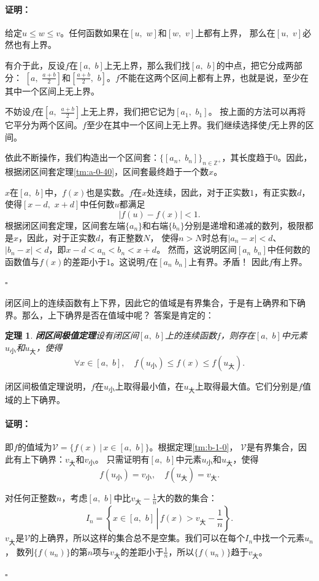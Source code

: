 \documentclass[12pt,UTF8]{ctexbook}
\newtheorem{tm}{定理}[section]
\renewenvironment{proof}{\paragraph{\textbf{证明：}}}{\hfill$\square$}
\begin{document}
\begin{appendix}
\begin{proof}
    给定$u \leqslant w \leqslant v$。任何函数如果在$[u,\,\, w]$和$[w,\,\, v]$上都有上界，
    那么在$[u,\,\, v]$必然也有上界。

    有介于此，反设$f$在$[a,\,\, b]$上无上界，那么我们找$[a,\,\, b]$的中点，把它分成两部分：
    $[a,\,\,\frac{a+b}{2}]$和$[\frac{a+b}{2},\,\, b]$。$f$不能在这两个区间上都有上界，也就是说，至少在其中一个区间上无上界。

    不妨设$f$在$[a,\,\,\frac{a+b}{2}]$上无上界，我们把它记为$[a_1,\,\, b_1]$。
    按上面的方法可以再将它平分为两个区间。$f$至少在其中一个区间上无上界。我们继续选择使$f$无上界的区间。

    依此不断操作，我们构造出一个区间套：$\{[a_n,\,\,b_n]\}_{n\in\mathbb{Z}^+}$，其长度趋于$0$。因此，根据闭区间套定理\ref{tm:a-0-40}，区间套最终趋于一个数$x$。

    $x$在$[a,\,\, b]$中，$f(x)$也是实数。$f$在$x$处连续，因此，对于正实数$1$，有正实数$d$，使得$[x-d,\,\,x+d]$中任何数$u$都满足
    $$ |f(u) - f(x)| < 1.$$
    根据闭区间套定理，区间套左端$\{a_n\}$和右端$\{b_n\}$分别是递增和递减的数列，极限都是$x$，因此，对于正实数$d$，有正整数$N$，
    使得$n>N$时总有$|a_n - x| < d$、$|b_n - x| < d$，即$x - d < a_n < b_n < x+d$。
    然而，这说明区间$[a_n\,\,b_n]$中任何数的函数值与$f(x)$的差距小于$1$。这说明$f$在$[a_n\,\,b_n]$上有界。矛盾！
    因此$f$有上界。

\end{proof}

闭区间上的连续函数有上下界，因此它的值域是有界集合，于是有上确界和下确界。那么，上下确界是否在值域中呢？
答案是肯定的：
\begin{tm}{\textbf{闭区间极值定理}}\label{tm:b-1-5}
    设有闭区间$[a,\,\, b]$上的连续函数$f$，则存在$[a,\,\,b]$中元素$u_{\text{小}}$和$u_{\text{大}}$，使得
    $$ \forall x\in[a,\,\,b], \quad f(u_{\text{小}}) \leqslant f(x) \leqslant f(u_{\text{大}}).$$
\end{tm}
闭区间极值定理说明，$f$在$u_{\text{小}}$上取得最小值，在$u_{\text{大}}$上取得最大值。它们分别是$f$值域的上下确界。
\begin{proof}
    即$f$的值域为$\mathcal{V} = \{f(x) \, | \, x\in[a,\,\,b]\}$。根据定理\ref{tm:b-1-0}，
    $\mathcal{V}$是有界集合，因此有上下确界：$v_{\text{大}}$和$v_{\text{小}}$。
    只需证明有$[a,\,\,b]$中元素$u_{\text{小}}$和$u_{\text{大}}$，使得
    $$ f(u_{\text{小}}) = v_{\text{小}} , \quad f(u_{\text{大}}) = v_{\text{大}}.$$

    对任何正整数$n$，考虑$[a,\,\, b]$中比$v_{\text{大}} - \frac{1}{n}$大的数的集合：
    $$I_n = \left\{ x\in[a,\,\,b] \, \left| \, f(x) > v_{\text{大}} - \frac{1}{n} \right.\right\}.$$
    $v_{\text{大}}$是$\mathcal{V}$的上确界，所以这样的集合总不是空集。我们可以在每个$I_n$中找一个元素$u_n$，
    数列$\{f(u_n)\}$的第$n$项与$v_{\text{大}}$的差距小于$\frac{1}{n}$，所以$\{f(u_n)\}$趋于$v_{\text{大}}$。


\end{proof}
\end{appendix}
\end{document}
